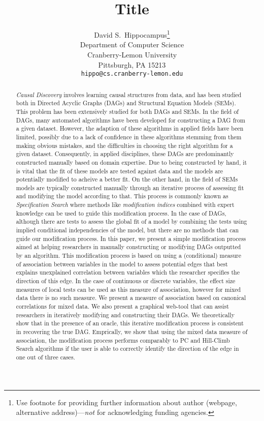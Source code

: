 \documentclass{article}
\title{Title}
\author{%
  David S.~Hippocampus\thanks{Use footnote for providing further information
    about author (webpage, alternative address)---\emph{not} for acknowledging
    funding agencies.} \\
  Department of Computer Science\\
  Cranberry-Lemon University\\
  Pittsburgh, PA 15213 \\
  \texttt{hippo@cs.cranberry-lemon.edu} \\
}
\begin{document}
\maketitle

\begin{abstract}
	\emph{Causal Discovery} involves learning causal structures from data,
	and has been studied both in Directed Acyclic Graphs (DAGs) and
	Structural Equation Models (SEMs). This problem has been extensively
	studied for both DAGs and SEMs. In the field of DAGs, many automated
	algorithms have been developed for constructing a DAG from a given
	dataset. However, the adaption of these algorithms in applied fields
	have been limited, possibly due to a lack of confidence in these
	algorithms stemming from them making obvious mistakes, and the
	difficulties in choosing the right algorithm for a given dataset.
	Consequently, in applied disciplines, these DAGs are predominantly
	constructed manually based on domain expertise. Due to being
	constructed by hand, it is vital that the fit of these models are
	tested against data and the models are potentially modified to acheive
	a better fit. On the other hand, in the field of SEMs models are
	typically constructed manually through an iterative process of
	assessing fit and modifying the model according to that. This process
	is commonly known as \emph{Specification Search} where methods like
	\emph{modification indices} combined with expert knowledge can be used
	to guide this modification process. In the case of DAGs, although there
	are tests to assess the global fit of a model by combining the tests
	using implied conditional independencies of the model, but there are no
	methods that can guide our modification process. In this paper, we
	present a simple modification process aimed at helping researchers in
	manually constructing or modifying DAGs outputted by an algorithm. This
	modification process is based on using a (conditional) measure of
	association between variables in the model to assess potential edges
	that best explains unexplained correlation between variables which the
	researcher specifies the direction of this edge. In the case of
	continuous or discrete variables, the effect size measures of local
	tests can be used as this measure of association, however for mixed
	data there is no such measure. We present a measure of association
	based on canonical correlations for mixed data. We also present a
	graphical web-tool that can assist researchers in iteratively modifying
	and constructing their DAGs. We theoretically show that in the presence
	of an oracle, this iterative modification process is consistent in
	recovering the true DAG. Emprically, we show that using the mixed data
	measure of association, the modification process performs comparably to
	PC and Hill-Climb Search algorithms if the user is able to correctly
	identify the direction of the edge in one out of three cases.
\end{abstract}
\end{document}
